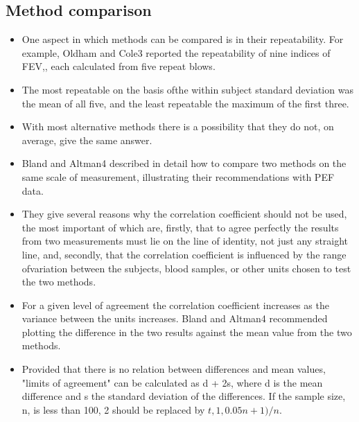 \documentclass{article}
\begin{document}
\subsection*{Method comparison}
\begin{itemize}
\item One aspect in which methods can be compared
is in their repeatability. For example, Oldham
and Cole3 reported the repeatability of nine
indices of FEV,, each calculated from five
repeat blows. 
\item The most repeatable on the basis
ofthe within subject standard deviation was the
mean of all five, and the least repeatable the
maximum of the first three.
\item With most alternative methods there is a
possibility that they do not, on average, give the
same answer. 
\item Bland and Altman4 described in detail how to compare two methods on the same
scale of measurement, illustrating their recommendations with PEF data. 
\item They give several
reasons why the correlation coefficient should not be used, the most important of which are,
firstly, that to agree perfectly the results from
two measurements must lie on the line of
identity, not just any straight line, and, secondly, that the correlation coefficient is influenced by the range ofvariation between the subjects, blood samples, or other units chosen to test the two methods. 
\item For a given level of agreement the correlation coefficient increases
as the variance between the units increases. Bland and Altman4 recommended plotting
the difference in the two results against the mean value from the two methods. 
\item Provided that there is no relation between differences and mean values, "limits of agreement" can be
calculated as d + 2s, where d is the mean
difference and s the standard deviation of the
differences. If the sample size, n, is less than
100, 2 should be replaced by
$t,1,0.05 n+ 1)/n$.
\end{itemize}\newpage
\end{document}
